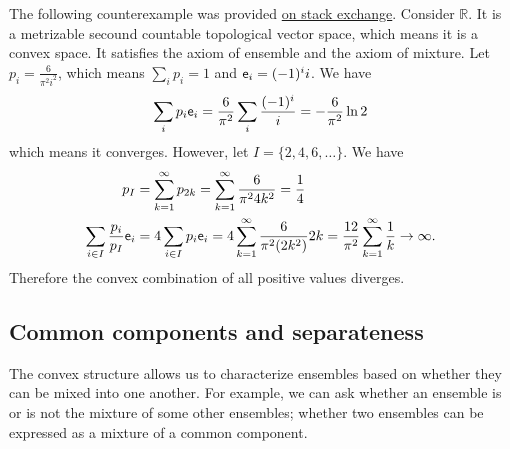 \begin{remark}
	The following counterexample was provided \href{https://math.stackexchange.com/questions/5085283/does-a-convex-subcombination-of-a-convergent-convex-combination-converge}{on stack exchange}. Consider $\mathbb{R}$. It is a metrizable secound countable topological vector space, which means it is a convex space. It satisfies the axiom of ensemble and the axiom of mixture. Let $p_i = \frac{6}{\pi^2 i^2}$, which means $\sum_i p_i = 1$ and $\mathsf{e}_i = (-1)^i i$. We have
	\begin{equation*}
		\sum_i p_i \mathsf{e}_i = \frac{6}{\pi^2} \sum_i \frac{(-1)^i}{i} = - \frac{6}{\pi^2} \ln 2
	\end{equation*}
	which means it converges. However, let $I = \{2,4,6,\dots\}$. We have
	\begin{equation*}
		\begin{aligned}
			p_I &= \sum_{k=1}^{\infty} p_{2k} = \sum_{k=1}^{\infty} \frac{6}{\pi^2 4 k^2} = \frac{1}{4} \\
			\sum_{i \in I} \frac{p_i}{p_I} \mathsf{e}_i &= 4 \sum_{i \in I} p_i \mathsf{e}_i = 4 \sum_{k=1}^{\infty} \frac{6}{\pi^2 (2k^2)} 2k = \frac{12}{\pi^2} \sum_{k=1}^{\infty} \frac{1}{k} \to \infty.
		\end{aligned}
	\end{equation*}
	Therefore the convex combination of all positive values diverges.
\end{remark}

\subsection{Common components and separateness}

The convex structure allows us to characterize ensembles based on whether they can be mixed into one another. For example, we can ask whether an ensemble is or is not the mixture of some other ensembles; whether two ensembles can be expressed as a mixture of a common component.

